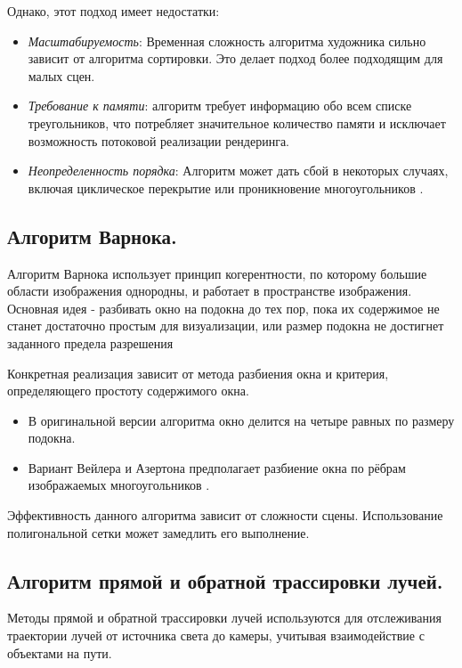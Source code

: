 Однако, этот подход имеет недостатки:
\begin{itemize}
\item \textit{Масштабируемость}: Временная сложность алгоритма художника сильно зависит от алгоритма сортировки. Это делает подход более подходящим для малых сцен.
\item \textit{Требование к памяти}: алгоритм требует информацию обо всем списке треугольников, что потребляет значительное количество памяти и исключает возможность потоковой реализации рендеринга.
\item \textit{Неопределенность порядка}: Алгоритм может дать сбой в некоторых случаях, включая циклическое перекрытие или проникновение многоугольников \cite{light}.
\end{itemize}

\subsection{Алгоритм Варнока.}

Алгоритм Варнока использует принцип когерентности, по которому большие области изображения однородны, и работает в пространстве изображения. Основная идея - разбивать окно на подокна до тех пор, пока их содержимое не станет достаточно простым для визуализации, или размер подокна не достигнет заданного предела разрешения \cite{del_line, varnok}

Конкретная реализация зависит от метода разбиения окна и 
критерия, определяющего простоту содержимого окна.
\begin{itemize}
\item В оригинальной версии алгоритма окно делится на четыре равных по размеру подокна.
\item Вариант Вейлера и Азертона предполагает разбиение окна по рёбрам изображаемых многоугольников \cite{varnok}.
\end{itemize}

Эффективность данного алгоритма зависит от сложности сцены. Использование полигональной сетки может замедлить его выполнение.


\subsection{Алгоритм прямой и обратной трассировки лучей.}

Методы прямой и обратной трассировки лучей используются для отслеживания траектории лучей от источника света до камеры, учитывая взаимодействие с объектами на пути. 

